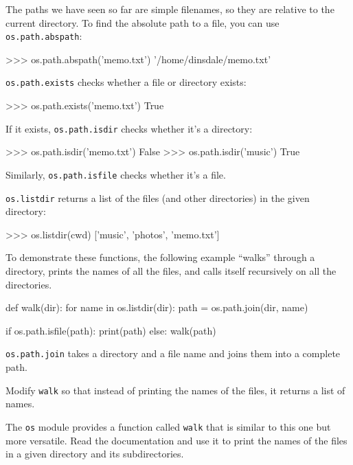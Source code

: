 The paths we have seen so far are simple filenames, so they are
relative to the current directory.  To find the absolute path to
a file, you can use {\tt os.path.abspath}:

\beforeverb
\begin{pyinterpreter}
>>> os.path.abspath('memo.txt')
'/home/dinsdale/memo.txt'
\end{pyinterpreter}
\afterverb
%
{\tt os.path.exists} checks
whether a file or directory exists:


\beforeverb
\begin{pyinterpreter}
>>> os.path.exists('memo.txt')
True
\end{pyinterpreter}
\afterverb
%
If it exists, {\tt os.path.isdir} checks whether it's a directory:

\beforeverb
\begin{pyinterpreter}
>>> os.path.isdir('memo.txt')
False
>>> os.path.isdir('music')
True
\end{pyinterpreter}
\afterverb
%
Similarly, {\tt os.path.isfile} checks whether it's a file.

{\tt os.listdir} returns a list of the files (and other directories)
in the given directory:

\beforeverb
\begin{pyinterpreter}
>>> os.listdir(cwd)
['music', 'photos', 'memo.txt']
\end{pyinterpreter}
\afterverb
%
To demonstrate these functions, the following example
``walks'' through a directory, prints
the names of all the files, and calls itself recursively on
all the directories.


\beforeverb
\begin{pycode}
def walk(dir):
    for name in os.listdir(dir):
        path = os.path.join(dir, name)

        if os.path.isfile(path):
            print(path)
        else:
            walk(path)
\end{pycode}
\afterverb
%
{\tt os.path.join} takes a directory and a file name and joins
them into a complete path.  

\begin{exercise}
Modify {\tt walk} so that instead of printing the names of
the files, it returns a list of names.
\end{exercise}

\begin{exercise}
The {\tt os} module provides a function called {\tt walk}
that is similar to this one but more versatile.  Read
the documentation and use it to print the names of the
files in a given directory and its subdirectories.
\end{exercise}


